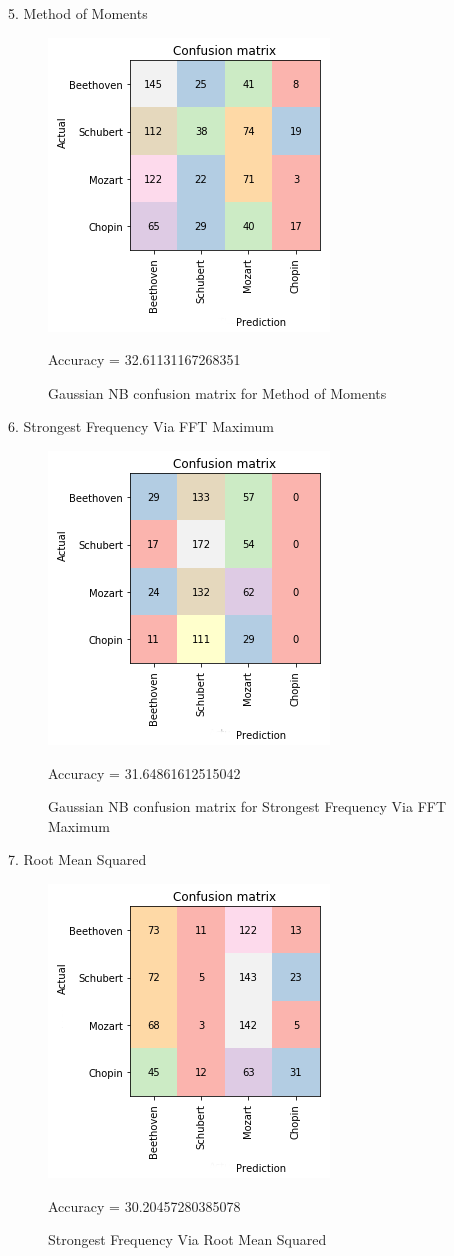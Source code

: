 \documentclass[11pt]{article}
\makeatletter
\def\maxwidth{\ifdim\Gin@nat@width>\linewidth\linewidth
    \else\Gin@nat@width\fi}
\let\Oldincludegraphics\includegraphics
\renewcommand{\includegraphics}[1]{\Oldincludegraphics[width=.8\maxwidth]{#1}}
\makeatother
\begin{document}
5. Method of Moments

\begin{figure}[h!]
\includegraphics{report/plots/Moments.png}\caption{Gaussian NB confusion matrix for Method of Moments}
Accuracy = 32.61131167268351
\end{figure}


6. Strongest Frequency Via FFT Maximum

\begin{figure}[h!]
\includegraphics{report/plots/FFTMax.png}
\caption{Gaussian NB confusion matrix for Strongest Frequency Via FFT Maximum}
Accuracy = 31.64861612515042
\end{figure}

7. Root Mean Squared

\begin{figure}[h!]
\includegraphics{report/plots/RMS.png} 
\caption{Strongest Frequency Via Root Mean Squared}
Accuracy = 30.20457280385078
\end{figure}
\end{document}
